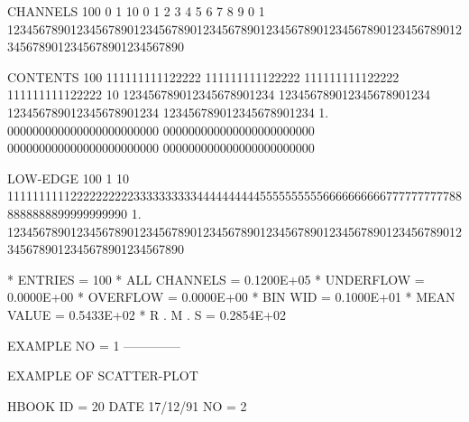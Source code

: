 \begin{Listing}
 CHANNELS 100   0                                                                                                  1   
           10   0        1         2         3         4         5         6         7         8         9         0   
            1   1234567890123456789012345678901234567890123456789012345678901234567890123456789012345678901234567890   
 
 CONTENTS 100            111111111122222          111111111122222          111111111122222          111111111122222 
           10   123456789012345678901234 123456789012345678901234 123456789012345678901234 123456789012345678901234 
            1.  000000000000000000000000 000000000000000000000000 000000000000000000000000 000000000000000000000000 
 
 LOW-EDGE 100                                                                                                      1
           10            1111111111222222222233333333334444444444555555555566666666667777777777888888888899999999990
            1.  1234567890123456789012345678901234567890123456789012345678901234567890123456789012345678901234567890
 
 * ENTRIES =        100      * ALL CHANNELS = 0.1200E+05      * UNDERFLOW = 0.0000E+00      * OVERFLOW = 0.0000E+00
 * BIN WID = 0.1000E+01      * MEAN VALUE   = 0.5433E+02      * R . M . S = 0.2854E+02

\finalnewpage

 EXAMPLE NO = 1                                                                  
 --------------                                                                  
 
 EXAMPLE OF SCATTER-PLOT                                                         
 
 HBOOK     ID =        20                                        DATE  17/12/91              NO =   2
 

\end{Listing}
